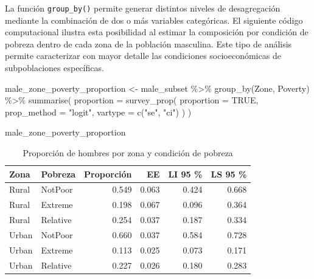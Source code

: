\documentclass[
  spanish,
  11pt,
  letterpaper,
  oneside,
  open=any]{scrbook}
\newenvironment{Shaded}{\begin{snugshade}}{\end{snugshade}}
\newcommand{\AttributeTok}[1]{\textcolor[rgb]{0.40,0.45,0.13}{#1}}
\newcommand{\ConstantTok}[1]{\textcolor[rgb]{0.56,0.35,0.01}{#1}}
\newcommand{\FunctionTok}[1]{\textcolor[rgb]{0.28,0.35,0.67}{#1}}
\newcommand{\NormalTok}[1]{\textcolor[rgb]{0.00,0.23,0.31}{#1}}
\newcommand{\OtherTok}[1]{\textcolor[rgb]{0.00,0.23,0.31}{#1}}
\newcommand{\SpecialCharTok}[1]{\textcolor[rgb]{0.37,0.37,0.37}{#1}}
\newcommand{\StringTok}[1]{\textcolor[rgb]{0.13,0.47,0.30}{#1}}
\begin{document}
La función \texttt{group\_by()} permite generar distintos niveles de
desagregación mediante la combinación de dos o más variables
categóricas. El siguiente código computacional ilustra esta posibilidad
al estimar la composición por condición de pobreza dentro de cada zona
de la población masculina. Este tipo de análisis permite caracterizar
con mayor detalle las condiciones socioeconómicas de subpoblaciones
específicas.

\begin{Shaded}
\begin{Highlighting}[]
\NormalTok{male\_zone\_poverty\_proportion }\OtherTok{\textless{}{-}}\NormalTok{ male\_subset }\SpecialCharTok{\%\textgreater{}\%}
  \FunctionTok{group\_by}\NormalTok{(Zone, Poverty) }\SpecialCharTok{\%\textgreater{}\%}
  \FunctionTok{summarise}\NormalTok{(}
    \AttributeTok{proportion =} \FunctionTok{survey\_prop}\NormalTok{(}
      \AttributeTok{proportion =} \ConstantTok{TRUE}\NormalTok{,}
      \AttributeTok{prop\_method =} \StringTok{"logit"}\NormalTok{,}
      \AttributeTok{vartype =} \FunctionTok{c}\NormalTok{(}\StringTok{"se"}\NormalTok{, }\StringTok{"ci"}\NormalTok{)}
\NormalTok{    )}
\NormalTok{  )}

\NormalTok{male\_zone\_poverty\_proportion}
\end{Highlighting}
\end{Shaded}

{

\begin{longtable}[]{@{}llrrrr@{}}

\caption{\label{tbl-prop-zona-pobreza-hombre}Proporción de hombres por
zona y condición de pobreza}

\tabularnewline

\toprule\noalign{}
Zona & Pobreza & Proporción & EE & LI 95 \% & LS 95 \% \\
\midrule\noalign{}
\endhead
\bottomrule\noalign{}
\endlastfoot
Rural & NotPoor & 0.549 & 0.063 & 0.424 & 0.668 \\
Rural & Extreme & 0.198 & 0.067 & 0.096 & 0.364 \\
Rural & Relative & 0.254 & 0.037 & 0.187 & 0.334 \\
Urban & NotPoor & 0.660 & 0.037 & 0.584 & 0.728 \\
Urban & Extreme & 0.113 & 0.025 & 0.073 & 0.171 \\
Urban & Relative & 0.227 & 0.026 & 0.180 & 0.283 \\

\end{longtable}

}
\end{document}
